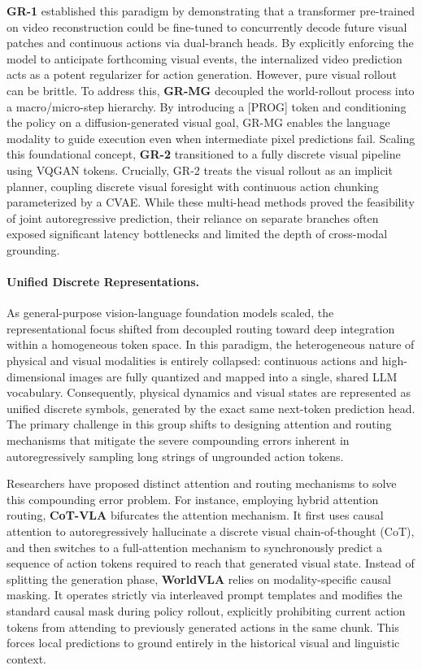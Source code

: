 \textbf{GR-1} \cite{GR1} established this paradigm by demonstrating that a transformer pre-trained on video reconstruction could be fine-tuned to concurrently decode future visual patches and continuous actions via dual-branch heads. By explicitly enforcing the model to anticipate forthcoming visual events, the internalized video prediction acts as a potent regularizer for action generation. However, pure visual rollout can be brittle. To address this, \textbf{GR-MG} \cite{grmg} decoupled the world-rollout process into a macro/micro-step hierarchy. By introducing a [PROG] token and conditioning the policy on a diffusion-generated visual goal, GR-MG enables the language modality to guide execution even when intermediate pixel predictions fail. Scaling this foundational concept, \textbf{GR-2} \cite{GR2} transitioned to a fully discrete visual pipeline using VQGAN tokens. Crucially, GR-2 treats the visual rollout as an implicit planner, coupling discrete visual foresight with continuous action chunking parameterized by a CVAE. While these multi-head methods proved the feasibility of joint autoregressive prediction, their reliance on separate branches often exposed significant latency bottlenecks and limited the depth of cross-modal grounding.




\paragraph{\textbf{Unified Discrete Representations.}} 


As general-purpose vision-language foundation models scaled, the representational focus shifted from decoupled routing toward deep integration within a homogeneous token space. In this paradigm, the heterogeneous nature of physical and visual modalities is entirely collapsed: continuous actions and high-dimensional images are fully quantized and mapped into a single, shared LLM vocabulary. Consequently, physical dynamics and visual states are represented as unified discrete symbols, generated by the exact same next-token prediction head. The primary challenge in this group shifts to designing attention and routing mechanisms that mitigate the severe compounding errors inherent in autoregressively sampling long strings of ungrounded action tokens.


Researchers have proposed distinct attention and routing mechanisms to solve this compounding error problem. For instance, employing hybrid attention routing, \textbf{CoT-VLA} \cite{CoTVLA} bifurcates the attention mechanism. It first uses causal attention to autoregressively hallucinate a discrete visual chain-of-thought (CoT), and then switches to a full-attention mechanism to synchronously predict a sequence of action tokens required to reach that generated visual state. Instead of splitting the generation phase, \textbf{WorldVLA} \cite{WorldVLA} relies on modality-specific causal masking. It operates strictly via interleaved prompt templates and modifies the standard causal mask during policy rollout, explicitly prohibiting current action tokens from attending to previously generated actions in the same chunk. This forces local predictions to ground entirely in the historical visual and linguistic context. 


